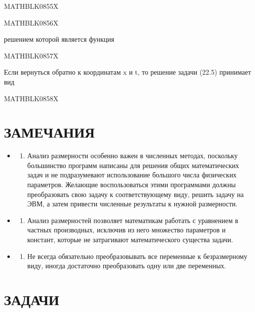 \documentclass[
]{article}
\providecommand{\tightlist}{%
  \setlength{\itemsep}{0pt}\setlength{\parskip}{0pt}}
\begin{document}
MATHBLK0855X

MATHBLK0856X

решением которой является функция

MATHBLK0857X

Если вернуться обратно к координатам x и t, то решение задачи (22.5)
принимает вид

MATHBLK0858X

\section{ЗАМЕЧАНИЯ}\label{ux437ux430ux43cux435ux447ux430ux43dux438ux44f-6}

\begin{itemize}
\tightlist
\item
  \begin{enumerate}
  \def\labelenumi{\arabic{enumi}.}
  \tightlist
  \item
    Анализ размерности особенно важен в численных методах, поскольку
    большинство программ написаны для решения общих математических задач
    и не подразумевают использование большого числа физических
    параметров. Желающие воспользоваться этими программами должны
    преобразовать свою задачу к соответствующему виду, решить задачу на
    ЭВМ, а затем привести численные результаты к нужной размерности.
  \end{enumerate}
\item
  \begin{enumerate}
  \def\labelenumi{\arabic{enumi}.}
  \setcounter{enumi}{1}
  \tightlist
  \item
    Анализ размерностей позволяет математикам работать с уравнением в
    частных производных, исключив из него множество параметров и
    констант, которые не затрагивают математического существа задачи.
  \end{enumerate}
\item
  \begin{enumerate}
  \def\labelenumi{\arabic{enumi}.}
  \setcounter{enumi}{2}
  \tightlist
  \item
    Не всегда обязательно преобразовывать все переменные к безразмерному
    виду, иногда достаточно преобразовать одну или две переменных.
  \end{enumerate}
\end{itemize}

\section{ЗАДАЧИ}\label{ux437ux430ux434ux430ux447ux438-6}
\end{document}
